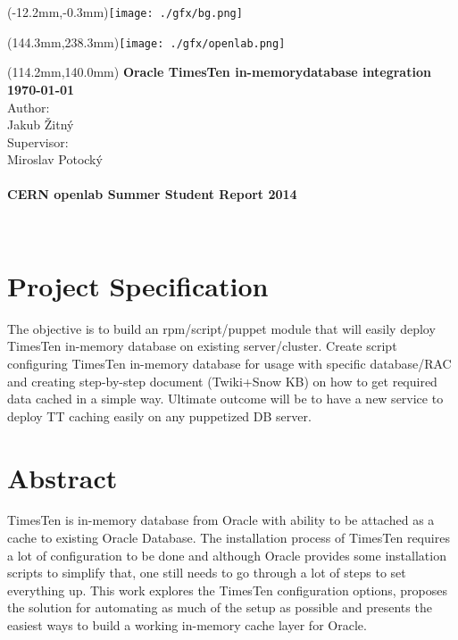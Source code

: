 \documentclass[11pt, letterpaper]{article}            %
\begin{document}
\begin{textblock*}{0mm}(-12.2mm,-0.3mm)\noindent \texttt{[image: ./gfx/bg.png]}\end{textblock*}
\begin{textblock*}{0mm}(144.3mm,238.3mm)\noindent \texttt{[image: ./gfx/openlab.png]}\end{textblock*}
\begin{textblock*}{150mm}(114.2mm,140.0mm)\noindent
{\bfseries\sffamily\textbf{\fontsize{20}{20}\selectfont\color{natc}Oracle TimesTen in-memory\newline database integration}}\\[36pt]
{\bfseries\sffamily\textbf{\fontsize{16}{20}\selectfont\color{natc}\motd\today}}\\[18pt]
{\sffamily\fontsize{14}{20}\selectfont\color{subc}Author:}\\
{\sffamily\fontsize{14}{20}\selectfont\color{subc}Jakub Žitný}\\[18pt]
{\sffamily\fontsize{14}{20}\selectfont\color{subc}Supervisor:}\\
{\sffamily\fontsize{14}{20}\selectfont\color{subc}Miroslav Potocký}\\
{\sffamily\fontsize{14}{20}\selectfont\color{subc}}\\[18pt]
\textbf{\bfseries\sffamily\fontsize{11}{20}\selectfont\color{subc}CERN openlab Summer Student Report 2014}

\end{textblock*}
~
\thispagestyle{empty}\newpage

\section*{Project Specification}
The objective is to build an rpm/script/puppet module that will easily deploy TimesTen in-memory database on existing server/cluster. Create script configuring TimesTen in-memory database for usage with specific database/RAC and creating step-by-step document (Twiki+Snow KB) on how to get required data cached in a simple way. Ultimate outcome will be to have a new service to deploy TT caching easily on any puppetized DB server.
\newpage

\section*{Abstract}
TimesTen is in-memory database from Oracle with ability to be attached as a cache to existing Oracle Database. The installation process of TimesTen requires a lot of configuration to be done and although Oracle provides some installation scripts to simplify that, one still needs to go through a lot of steps to set everything up. This work explores the TimesTen configuration options, proposes the solution for automating as much of the setup as possible and presents the easiest ways to build a working in-memory cache layer for Oracle.
\newpage
\end{document}
